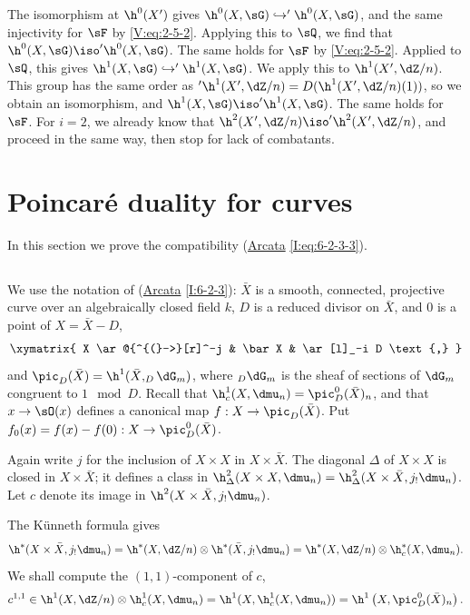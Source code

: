 The isomorphism at $\h^0(X')$ gives
$\h^0(X,\sG)\hookrightarrow '\h^0(X,\sG)$, and the same injectivity for
$\sF$ by \eqref{V:eq:2-5-2}. Applying this to $\sQ$, we find that $\h^0(X,\sG)\iso '\h^0(X,\sG)$. The same holds for $\sF$ by \eqref{V:eq:2-5-2}. Applied to $\sQ$, this gives
$\h^1(X,\sG)\hookrightarrow '\h^1(X,\sG)$. We apply this to
$\h^1(X',\dZ/n)$. This group has the same order as
$'\h^1(X',\dZ/n)=D(\h^1(X',\dZ/n)(1))$, so we obtain an isomorphism, and
$\h^1(X,\sG) \iso '\h^1(X,\sG)$. The same holds for $\sF$. For $i=2$, we
already know that $\h^2(X',\dZ/n) \iso '\h^2(X',\dZ/n)$, and proceed in the
same way, then stop for lack of combatants.


\section{Poincaré duality for curves}\label{V:3}

In this section we prove the compatibility
(\hyperref[I]{Arcata} \ref{I:eq:6-2-3-3}).


\subsection{}\label{V:3-1}

We use the notation of (\hyperref[I]{Arcata} \ref{I:6-2-3}): $\bar X$ is a
smooth, connected, projective curve over an algebraically closed field $k$,
$D$ is a reduced divisor on $\bar X$, and $0$ is a point of
$X=\bar X-D$,
\[\xymatrix{
  X \ar@{^{(}->}[r]^-j
    & \bar X
    & \ar[l]_-i D \text{,}
}\]
and $\pic_D(\bar X)=\h^1(\bar X,_D\dG_m)$, where $_D\dG_m$ is the sheaf of
sections of $\dG_m$ congruent to $1\mod D$. Recall that
$\h_c^1(X,\dmu_n) = \pic_D^0(\bar X)_n$, and that $x\to \sO(x)$ defines a
canonical map $f:X\to \pic_D(\bar X)$. Put
$f_0(x)=f(x)-f(0):X\to \pic_D^0(\bar X)$.

Again write $j$ for the inclusion of $X\times X$ in $X\times \bar X$. The
diagonal $\Delta$ of $X\times X$ is closed in $X\times \bar X$; it defines a
class in
$\h_\Delta^2(X\times X,\dmu_n)=\h_\Delta^2(X\times \bar X,j_!\dmu_n)$. Let
$c$ denote its image in $\h^2(X\times \bar X,j_!\dmu_n)$.

The K\"unneth formula gives
\[
  \h^*(X\times \bar X,j_!\dmu_n) = \h^*(X,\dZ/n)\otimes \h^*(\bar X,j_!\dmu_n) = \h^*(X,\dZ/n)\otimes \h_c^*(X,\dmu_n) \text{.}
\]
We shall compute the $(1,1)$-component of $c$,
\[
  c^{1,1} \in \h^1(X,\dZ/n)\otimes \h_c^1(X,\dmu_n) = \h^1(X,\h_c^1(X,\dmu_n)) = \h^1\left(X,\pic_D^0(\bar X)_n\right) \text{.}
\]

